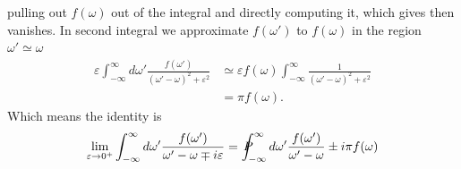 \documentclass[a4paper]{article}
\begin{document}
pulling out $f(\omega)$ out of the integral and directly computing it, which
gives then vanishes. In second integral we approximate $f(\omega')$ to
$f(\omega)$ in the region $\omega' \simeq \omega$
\begin{align}
    \varepsilon \int_{-\infty}^{\infty}d\omega' \frac{f(\omega')}{(\omega' -
    \omega)^2 + \varepsilon^2} &\simeq  \varepsilon f(\omega) \int_{-\infty}^{\infty}
    \frac{1}{(\omega' -\omega)^2 + \varepsilon^2}\\
    &= \pi f(\omega).
\end{align}
Which means the identity is
\begin{align}
    \lim_{\varepsilon \rightarrow 0^+} \int_{-\infty}^{\infty} d\omega'
    \frac{f(\omega')}{\omega' -\omega \mp i\varepsilon} =
    \PV_{-\infty}^{\infty} d\omega' \frac{f(\omega')}{\omega' -\omega} \pm
    i\pi f(\omega)\label{eq:pv}
\end{align}
\end{document}
